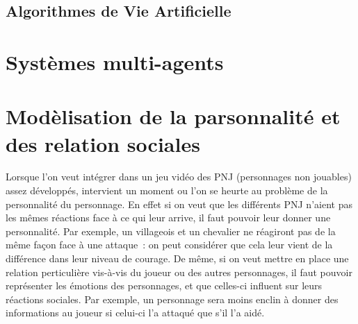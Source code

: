 \documentclass[asi]{picINSA}
\begin{document}
\section{Algorithmes de Vie Artificielle}
  
\chapter{Systèmes multi-agents}

\chapter{Modèlisation de la parsonnalité et des relation sociales}
Lorsque l'on veut intégrer dans un jeu vidéo des PNJ (personnages non jouables) assez développés, intervient un moment ou l'on se heurte au problème de la personnalité du personnage. En effet si on veut que les différents PNJ n'aient pas les mêmes réactions face à ce qui leur arrive, il faut pouvoir leur donner une personnalité. Par exemple, un villageois et un chevalier ne réagiront pas de la même façon face à une attaque : on peut considérer que cela leur vient de la différence dans leur niveau de courage. De même, si on veut mettre en place une relation perticulière vis-à-vis du joueur ou des autres personnages, il faut pouvoir représenter les émotions des personnages, et que celles-ci influent sur leurs réactions sociales. Par exemple, un personnage sera moins enclin à donner des informations au joueur si celui-ci l'a attaqué que s’il l'a aidé. 
\end{document}
